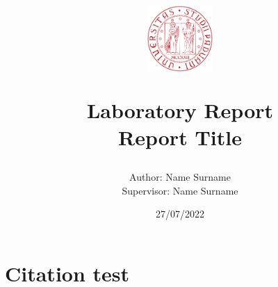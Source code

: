 \documentclass[twocolumn]{article}
\title{
    \vspace{-1cm}
    \includegraphics[height=2.5cm]{images/logo_unipd.png}
    \par
    \vspace{0.5cm}
    \textbf{Laboratory Report}\\
    Report Title
}
\author{
    Author: {Name Surname} \\
    Supervisor: {Name Surname}
}
\date{27/07/2022}
\begin{document}
\pagecolor{blond} %

\maketitle


%
%
%
%
%
\begin{abstract}
       
\end{abstract}
\section*{Citation test}
\cite{dvorak2011}










\end{document}
